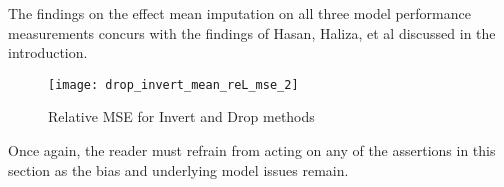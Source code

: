 \documentclass[../paper.tex]{subfiles}
\begin{document}
The findings on the effect mean imputation on all three model performance measurements concurs with the findings of Hasan, Haliza, et al discussed in the introduction.

\begin{figure}[H]
\centering
%
\texttt{[image: drop\_invert\_mean\_reL\_mse\_2]}
\caption{Relative MSE for Invert and Drop methods}
\label{fig:drop_invert_mean_rel_mse_2}
\end{figure}


Once again, the reader must refrain from acting on any of the assertions in this section as the bias and underlying model issues remain.
\end{document}
